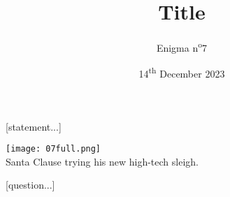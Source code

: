 \documentclass[a4paper, top=10mm]{article}
\title{\textbf{\huge{Title}}}
\author{Enigma n\textsuperscript{o}7}
\date{14\textsuperscript{th} December 2023}
\begin{document}
	\maketitle
	
	[statement...]
	
	\begin{center}
		\texttt{[image: 07full.png]}\\
		Santa Clause trying his new high-tech sleigh.
	\end{center}
	
	[question...]
	
\end{document}
